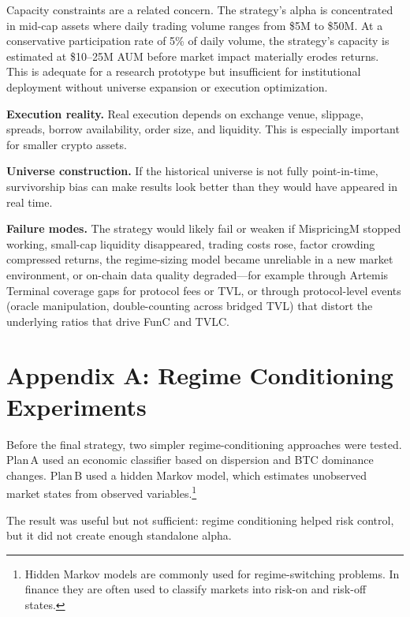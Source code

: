 \documentclass[11pt,a4paper]{article}
\begin{document}
Capacity constraints are a related concern. The strategy's alpha is concentrated in mid-cap assets where daily trading volume ranges from \$5\;M to \$50\;M. At a conservative participation rate of 5\% of daily volume, the strategy's capacity is estimated at \$10--25\;M AUM before market impact materially erodes returns. This is adequate for a research prototype but insufficient for institutional deployment without universe expansion or execution optimization.

\textbf{Execution reality.}\;
Real execution depends on exchange venue, slippage, spreads, borrow availability, order size, and liquidity. This is especially important for smaller crypto assets.

\textbf{Universe construction.}\;
If the historical universe is not fully point-in-time, survivorship bias can make results look better than they would have appeared in real time.

\textbf{Failure modes.}\;
The strategy would likely fail or weaken if MispricingM stopped working, small-cap liquidity disappeared, trading costs rose, factor crowding compressed returns, the regime-sizing model became unreliable in a new market environment, or on-chain data quality degraded---for example through Artemis Terminal coverage gaps for protocol fees or TVL, or through protocol-level events (oracle manipulation, double-counting across bridged TVL) that distort the underlying ratios that drive FunC and TVLC.

\appendix
\section{Appendix A: Regime Conditioning Experiments}

Before the final strategy, two simpler regime-conditioning approaches were tested. Plan\,A used an economic classifier based on dispersion and BTC dominance changes. Plan\,B used a hidden Markov model, which estimates unobserved market states from observed variables.\footnote{Hidden Markov models are commonly used for regime-switching problems. In finance they are often used to classify markets into risk-on and risk-off states.}

The result was useful but not sufficient: regime conditioning helped risk control, but it did not create enough standalone alpha.
\end{document}
